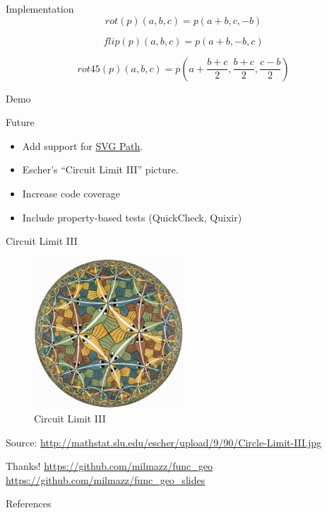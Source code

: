 \documentclass{beamer}
\begin{document}
    \begin{frame}{Implementation}
        \begin{equation*}
        rot(p)(a, b, c) = p(a + b, c, -b)
        \end{equation*}

        \begin{equation*}
        flip(p)(a, b, c) = p(a + b, -b, c)
        \end{equation*}

        \begin{equation*}
        rot45(p)(a, b, c) = p(a + \frac{b + c}{2}, \frac{b + c}{2}, \frac{c - b}{2})
        \end{equation*}
    \end{frame}

    \begin{frame}[standout]
        Demo
    \end{frame}

    \begin{frame}{Future}
        \begin{itemize}
            \item Add support for \href{https://developer.mozilla.org/en/docs/Web/SVG/Tutorial/Paths}{SVG Path}.
            \item Escher's ``Circuit Limit III'' picture.
            \item Increase code coverage
            \item Include property-based tests (QuickCheck, Quixir)
        \end{itemize}

    \end{frame}

    \begin{frame}{Circuit Limit III}
        \begin{figure}
            \centering
            \includegraphics[width=0.5\textwidth]{./figs/Circle-Limit-III}
            \caption{Circuit Limit III\label{fig:circuit_limit_iii}}
        \end{figure}
        {\tiny Source: \url{http://mathstat.slu.edu/escher/upload/9/90/Circle-Limit-III.jpg}}
    \end{frame}

    \begin{frame}[standout]
        Thanks!
        \url{https://github.com/milmazz/func\_geo}
        \url{https://github.com/milmazz/func\_geo\_slides}
    \end{frame}

    \begin{frame}[allowframebreaks]{References}
        
        
    \end{frame}
\end{document}
